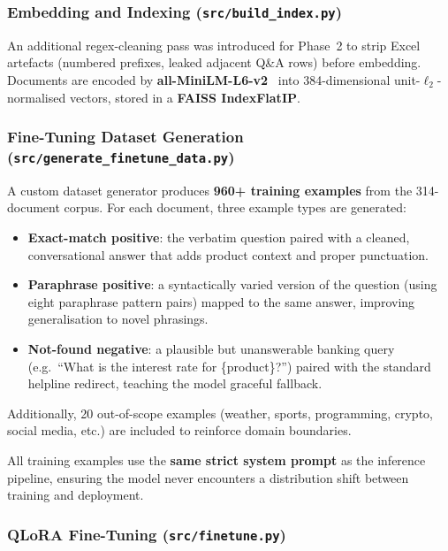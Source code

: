 \documentclass[12pt,a4paper]{article}
\begin{document}
\subsubsection{Embedding and Indexing (\texttt{src/build\_index.py})}

An additional regex-cleaning pass was introduced for Phase~2 to strip Excel
artefacts (numbered prefixes, leaked adjacent Q\&A rows) before embedding.
Documents are encoded by \textbf{all-MiniLM-L6-v2}~\cite{reimers2019sentencebert}
into 384-dimensional unit-$\ell_2$-normalised vectors, stored in a
\textbf{FAISS IndexFlatIP}.

\subsubsection{Fine-Tuning Dataset Generation (\texttt{src/generate\_finetune\_data.py})}

A custom dataset generator produces \textbf{960+ training examples} from the
314-document corpus.  For each document, three example types are generated:

\begin{itemize}
  \item \textbf{Exact-match positive}: the verbatim question paired with a
        cleaned, conversational answer that adds product context and proper
        punctuation.
  \item \textbf{Paraphrase positive}: a syntactically varied version of the
        question (using eight paraphrase pattern pairs) mapped to the same
        answer, improving generalisation to novel phrasings.
  \item \textbf{Not-found negative}: a plausible but unanswerable banking query
        (e.g.\ ``What is the interest rate for \{product\}?'') paired with the
        standard helpline redirect, teaching the model graceful fallback.
\end{itemize}

Additionally, 20 out-of-scope examples (weather, sports, programming, crypto,
social media, etc.) are included to reinforce domain boundaries.

All training examples use the \textbf{same strict system prompt} as the inference
pipeline, ensuring the model never encounters a distribution shift between training
and deployment.

\subsubsection{QLoRA Fine-Tuning (\texttt{src/finetune.py})}
\end{document}
